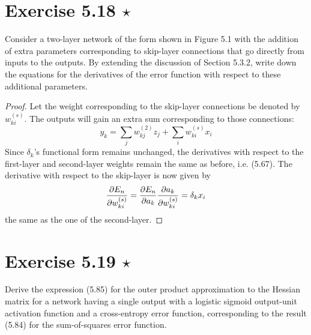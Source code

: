 \section*{Exercise 5.18 $\star$}
Consider a two-layer network of the form shown in Figure 5.1 with the addition
of extra parameters corresponding to skip-layer connections
that go directly from inputs to the outputs. By extending the discussion of Section 5.3.2,
write down the equations for the derivatives of the error function with respect
to these additional parameters.

\vspace{1em}

\begin{proof}
    Let the weight corresponding to the skip-layer connections be denoted by $w_{ki}^{(s)}$. 
    The outputs will gain an extra sum corresponding to those connections:
    \[
        y_k = \sum_{j} w_{kj}^{(2)} z_j + \sum_{i} w_{ki}^{(s)} x_i
    \] 
    Since $\delta_k$'s functional form remains unchanged, the derivatives
    with respect to the first-layer and second-layer weights remain the same as
    before, i.e. (5.67). The derivative with respect to the skip-layer is now given by
    \[
        \pdv{E_n}{w_{ki}^{(s)}} = \pdv{E_n}{a_k} \pdv{a_k}{w_{ki}^{(s)}}
        = \delta_k x_i
    \] 
    the same as the one of the second-layer.
\end{proof}

\section*{Exercise 5.19 $\star$}
Derive the expression (5.85) for the outer product approximation
to the Hessian matrix for a network having a single output
with a logistic sigmoid output-unit activation function and a cross-entropy
error function, corresponding to the result (5.84) for the
sum-of-squares error function.

\vspace{1em}

